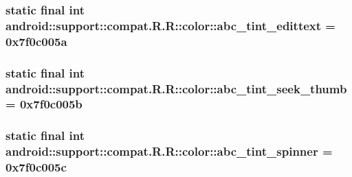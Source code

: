 \hypertarget{classandroid_1_1support_1_1compat_1_1_r_1_1color_50cadd1604d09a8e8b9dc6719d088e6e}{
\subsubsection[{abc\_\-tint\_\-edittext}]{\setlength{\rightskip}{0pt plus 5cm}static final int android::support::compat.R.R::color::abc\_\-tint\_\-edittext = 0x7f0c005a}}
\label{classandroid_1_1support_1_1compat_1_1_r_1_1color_50cadd1604d09a8e8b9dc6719d088e6e}


\hypertarget{classandroid_1_1support_1_1compat_1_1_r_1_1color_b672eb3cc6459cce0fbff2f8197628f6}{
\subsubsection[{abc\_\-tint\_\-seek\_\-thumb}]{\setlength{\rightskip}{0pt plus 5cm}static final int android::support::compat.R.R::color::abc\_\-tint\_\-seek\_\-thumb = 0x7f0c005b}}
\label{classandroid_1_1support_1_1compat_1_1_r_1_1color_b672eb3cc6459cce0fbff2f8197628f6}


\hypertarget{classandroid_1_1support_1_1compat_1_1_r_1_1color_5a50e09ffdba8cd70eab81dbe0941f4b}{
\subsubsection[{abc\_\-tint\_\-spinner}]{\setlength{\rightskip}{0pt plus 5cm}static final int android::support::compat.R.R::color::abc\_\-tint\_\-spinner = 0x7f0c005c}}
\label{classandroid_1_1support_1_1compat_1_1_r_1_1color_5a50e09ffdba8cd70eab81dbe0941f4b}



